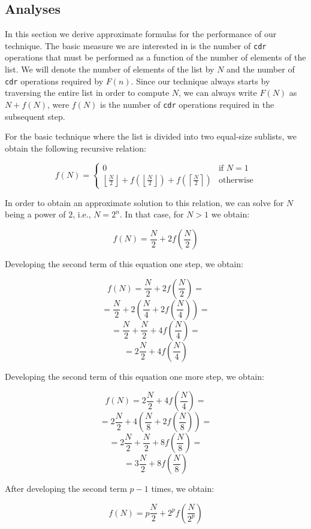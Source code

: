 \subsection{Analyses}
\label{sec-analyses}

In this section we derive approximate formulas for the performance of
our technique.  The basic measure we are interested in is the number
of \texttt{cdr} operations that must be performed as a function of the
number of elements of the list.  We will denote the number of elements
of the list by $N$ and the number of \texttt{cdr} operations required
by $F(n)$.  Since our technique always starts by traversing the entire
list in order to compute $N$, we can always write $F(N)$ as $N +
f(N)$, were $f(N)$ is the number of \texttt{cdr} operations required
in the subsequent step.

For the basic technique where the list is divided into two equal-size
sublists, we obtain the following recursive relation:

\[ f(N) = \left\{ \begin{array}{ll}
                    0 & \mbox{if $N = 1$} \\
                    \left\lfloor\frac{N}{2}\right\rfloor
                    + f(\left\lfloor\frac{N}{2}\right\rfloor)
                    + f(\left\lceil\frac{N}{2}\right\rceil) &
                    \mbox{otherwise}
                  \end{array} \right. \]

In order to obtain an approximate solution to this relation, we can
solve for $N$ being a power of $2$, i.e., $N = 2^n$.  In that case,
for $N>1$ we obtain:

\[ f(N) = \frac{N}{2} + 2f(\frac{N}{2}) \]

Developing the second term of this equation one step, we obtain:

\[ f(N) = \frac{N}{2} + 2f(\frac{N}{2}) = \]
\[ = \frac{N}{2} + 2(\frac{N}{4} + 2f(\frac{N}{4})) =\]
\[ = \frac{N}{2} + \frac{N}{2} + 4f(\frac{N}{4}) =\]
\[ = 2\frac{N}{2} + 4f(\frac{N}{4})\]

Developing the second term of this equation one more step, we obtain:

\[ f(N) = 2\frac{N}{2} + 4f(\frac{N}{4}) = \]
\[ = 2\frac{N}{2} + 4(\frac{N}{8} + 2f(\frac{N}{8})) =\]
\[ = 2\frac{N}{2} + \frac{N}{2} + 8f(\frac{N}{8}) =\]
\[ = 3\frac{N}{2} + 8f(\frac{N}{8}) \]

After developing the second term $p-1$ times, we obtain:

\[ f(N) = p\frac{N}{2} + 2^pf(\frac{N}{2^p})\]

